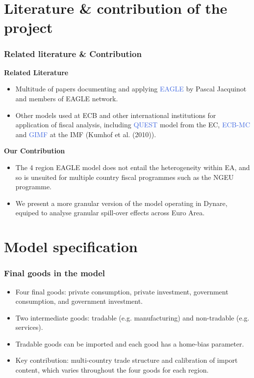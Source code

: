 \documentclass[british,english,aspectratio=169]{beamer}
\begin{document}
\section{Literature \& contribution of the project}
\begin{frame}
  \frametitle{Related literature \& Contribution}
  \textbf{Related Literature}
  \begin{itemize}
  \item Multitude of papers documenting and applying \textcolor{royalblue}{EAGLE} by Pascal Jacquinot and members of EAGLE network.
  \item Other models used at ECB and other international institutions for application of fiscal analysis, including \textcolor{royalblue}{QUEST} model from the EC, \textcolor{royalblue}{ECB-MC} and \textcolor{royalblue}{GIMF} at the IMF (Kumhof et al. (2010)).
  \end{itemize}
  \textbf{Our Contribution}
  \begin{itemize}
  \item The 4 region EAGLE model does not entail the heterogeneity within EA, and so is unsuited for multiple country fiscal programmes such as the NGEU programme.
  \item We present a more granular version of the model operating in Dynare, equiped to analyse granular spill-over effects across Euro Area. 
  \end{itemize}
  \end{frame}


\section{Model specification}

\begin{frame}
  \frametitle{Final goods in the model}
  \begin{itemize}
  \item Four final goods: private consumption, private investment, government consumption, and government investment.
  \item Two intermediate goods: tradable (e.g. manufacturing) and non-tradable (e.g. services).
   \item Tradable goods can be imported and each good has a home-bias parameter. 
   \item Key contribution:  multi-country trade structure and calibration of import content, which varies throughout the four goods for each region.
  \end{itemize}
\end{frame}
\end{document}
